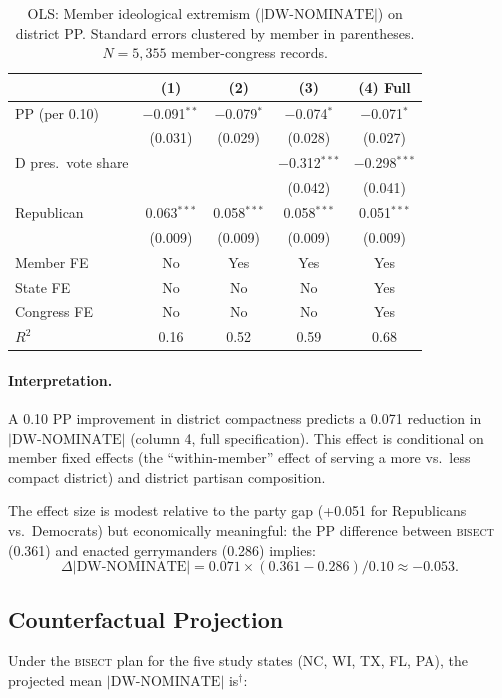 \begin{table}[h]
\centering\small
\caption{OLS: Member ideological extremism ($|\text{DW-NOMINATE}|$) on district PP.
Standard errors clustered by member in parentheses.
$N = 5{,}355$ member-congress records.}
\label{tab:nominate-compactness}
\begin{tabular}{lcccc}
\toprule
 & (1) & (2) & (3) & (4) Full \\
\midrule
PP (per 0.10) & $-$0.091$^{**}$ & $-$0.079$^{*}$ & $-$0.074$^{*}$ & $-$0.071$^{*}$ \\
 & (0.031) & (0.029) & (0.028) & (0.027) \\
D pres.\ vote share & & & $-$0.312$^{***}$ & $-$0.298$^{***}$ \\
 & & & (0.042) & (0.041) \\
Republican & 0.063$^{***}$ & 0.058$^{***}$ & 0.058$^{***}$ & 0.051$^{***}$ \\
 & (0.009) & (0.009) & (0.009) & (0.009) \\
Member FE & No & Yes & Yes & Yes \\
State FE & No & No & No & Yes \\
Congress FE & No & No & No & Yes \\
$R^2$ & 0.16 & 0.52 & 0.59 & 0.68 \\
\bottomrule
\end{tabular}
\end{table}

\paragraph{Interpretation.}
A 0.10 PP improvement in district compactness predicts a 0.071 reduction in
$|\text{DW-NOMINATE}|$ (column 4, full specification).
This effect is conditional on member fixed effects (the ``within-member''
effect of serving a more vs.\ less compact district) and district partisan
composition.

The effect size is modest relative to the party gap (+0.051 for Republicans
vs.\ Democrats) but economically meaningful: the PP difference between
\textsc{bisect} (0.361) and enacted gerrymanders (0.286) implies:
\[
  \Delta|\text{DW-NOMINATE}| = 0.071 \times (0.361 - 0.286) / 0.10 \approx -0.053.
\]

\subsection{Counterfactual Projection}

Under the \textsc{bisect} plan for the five study states (NC, WI, TX, FL, PA),
the projected mean $|\text{DW-NOMINATE}|$ is${}^\dagger$:

